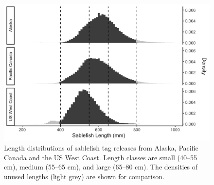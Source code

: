 \documentclass{article}
\begin{document}


\begin{figure}[htb]
    \centering
    \includegraphics[width = \textwidth]{figs/hist-length-region}
    \caption{Length distributions of sablefish tag releases from Alaska, Pacific Canada and the US West Coast. Length classes are small (40--55 cm), medium (55--65 cm), and large (65--80 cm). The densities of unused lengths (light grey) are shown for comparison.}
    \label{fig:hist-length-region}
\end{figure}
\end{document}
